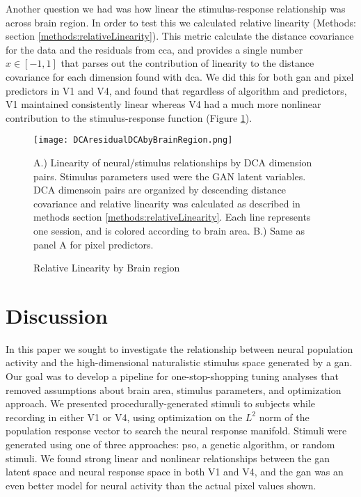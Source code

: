 Another question we had was how linear the stimulus-response relationship was across brain region. In order to test this we calculated relative linearity (Methods: section \ref{methods:relativeLinearity}). This metric calculate the distance covariance for the data and the residuals from \gls{cca}, and provides a single number $x \in [-1,1]$ that parses out the contribution of linearity to the distance covariance for each dimension found with \gls{dca}. We did this for both \gls{gan} and pixel predictors in V1 and V4, and found that regardless of algorithm and predictors, V1 maintained consistently linear whereas V4 had a much more nonlinear contribution to the stimulus-response function (Figure \ref{fig:dcaLinearity}).
	
\begin{figure}
	\centering
	\texttt{[image: DCAresidualDCAbyBrainRegion.png]}
	\caption{Relative Linearity by Brain region}{A.) Linearity of neural/stimulus relationships by DCA dimension pairs. Stimulus parameters used were the GAN latent variables. DCA dimensoin pairs are organized by descending distance covariance and relative linearity was calculated as described in methods section \ref{methods:relativeLinearity}. Each line represents one session, and is colored according to brain area. B.) Same as panel A for pixel predictors.}
	\label{fig:dcaLinearity}
\end{figure}
	

	
\section{Discussion}
\glsresetall
In this paper we sought to investigate the relationship between neural population activity and the high-dimensional naturalistic stimulus space generated by a \gls{gan}. Our goal was to develop a pipeline for one-stop-shopping tuning analyses that removed assumptions about brain area, stimulus parameters, and optimization approach. We presented procedurally-generated stimuli to subjects while recording in either V1 or V4, using optimization on the $L^2$ norm of the population response vector to search the neural response manifold. Stimuli were generated using one of three approaches: \gls{pso}, a genetic algorithm, or random stimuli. We found strong linear and nonlinear relationships between the \gls{gan} latent space and neural response space in both V1 and V4, and the \gls{gan} was an even better model for neural activity than the actual pixel values shown.

